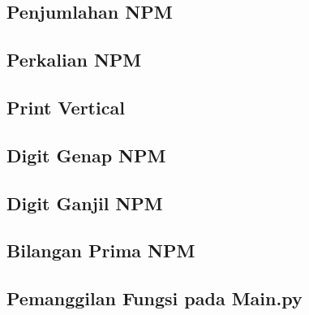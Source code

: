 \subsection{Penjumlahan NPM}

\subsection{Perkalian NPM}

\subsection{Print Vertical}

\subsection{Digit Genap NPM}

\subsection{Digit Ganjil NPM}

\subsection{Bilangan Prima NPM}

\subsection{Pemanggilan Fungsi pada Main.py}
